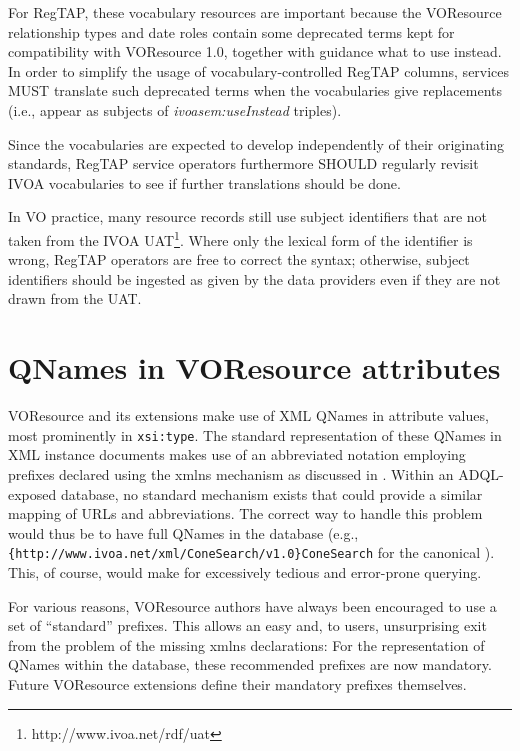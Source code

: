 \documentclass[11pt,a4paper]{ivoa}
\begin{document}
For RegTAP, these vocabulary resources are important because the
VOResource relationship types and date roles contain some deprecated
terms kept for compatibility with VOResource 1.0, together with guidance
what to use instead.  In order to simplify the usage of
vocabulary-controlled RegTAP columns, services MUST translate such deprecated
terms when the vocabularies give replacements (i.e., appear as subjects
of \emph{ivoasem:useInstead} triples).

Since the vocabularies are expected to develop independently of their
originating standards, RegTAP service operators furthermore SHOULD regularly
revisit IVOA vocabularies to see if further translations should be done.

In VO practice, many resource records still use subject identifiers that
are not taken from the IVOA UAT\footnote{{http://www.ivoa.net/rdf/uat}}.
Where only the lexical form of the identifier is wrong, RegTAP operators
are free to correct the syntax; otherwise, subject identifiers should be
ingested as given by the data providers even if they are not drawn from
the UAT.


\section{QNames in VOResource attributes}

\label{qnameatts}

VOResource and its extensions make use of XML QNames in attribute
values, most prominently in \texttt{xsi:type}.  The standard
representation of these QNames in XML instance documents makes use of an
abbreviated notation employing prefixes declared using the xmlns mechanism
as discussed in \citet{std:XMLNS}.  Within an ADQL-exposed database, no
standard mechanism exists that could provide a similar mapping of URLs
and abbreviations.  The correct way to handle this problem would thus be
to have full QNames in the database (e.g.,
\verb|{http://www.ivoa.net/xml/ConeSearch/v1.0}ConeSearch| for the
canonical ).  This, of course, would make for
excessively tedious and error-prone querying.

For various reasons, VOResource authors have always been encouraged
to use a set of ``standard'' prefixes.  This allows an easy and, to users,
unsurprising exit from the problem of the missing xmlns declarations:
For the representation of QNames within the database, these recommended
prefixes are now mandatory. Future VOResource extensions define their
mandatory prefixes themselves.
\end{document}
